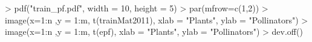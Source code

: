 > pdf("train_pf.pdf", width = 10, height = 5)
> par(mfrow=c(1,2))
> image(x=1:n ,y = 1:m, t(trainMat2011), xlab = "Plants", ylab = "Pollinators")
> image(x=1:n ,y = 1:m, t(epf), xlab = "Plants", ylab = "Pollinators")
> dev.off()

